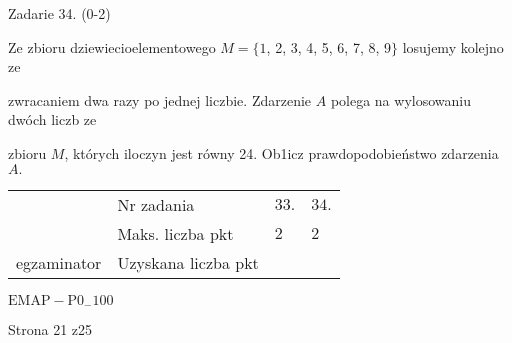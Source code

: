 \documentclass[a4paper,12pt]{article}
\begin{document}
Zadarie 34. (0-2)

Ze zbioru dziewiecioelementowego $M=\{1$, 2, 3, 4, 5, 6, 7, 8, 9$\}$ losujemy kolejno ze

zwracaniem dwa razy po jednej liczbie. Zdarzenie $A$ polega na wylosowaniu dwóch liczb ze

zbioru $M$, których iloczyn jest równy 24. Ob1icz prawdopodobieństwo zdarzenia $A.$
\begin{center}
\begin{tabular}{|l|l|l|l|}
\cline{2-4}
&	\multicolumn{1}{|l|}{Nr zadania}&	\multicolumn{1}{|l|}{$33.$}&	\multicolumn{1}{|l|}{ $34.$}	\\
\cline{2-4}
&	\multicolumn{1}{|l|}{Maks. liczba pkt}&	\multicolumn{1}{|l|}{$2$}&	\multicolumn{1}{|l|}{ $2$}	\\
\cline{2-4}
\multicolumn{1}{|l|}{egzaminator}&	\multicolumn{1}{|l|}{Uzyskana liczba pkt}&	\multicolumn{1}{|l|}{}&	\multicolumn{1}{|l|}{}	\\
\hline
\end{tabular}

\end{center}
$\mathrm{E}\mathrm{M}\mathrm{A}\mathrm{P}-\mathrm{P}0_{-}100$

Strona 21 z25
\end{document}
